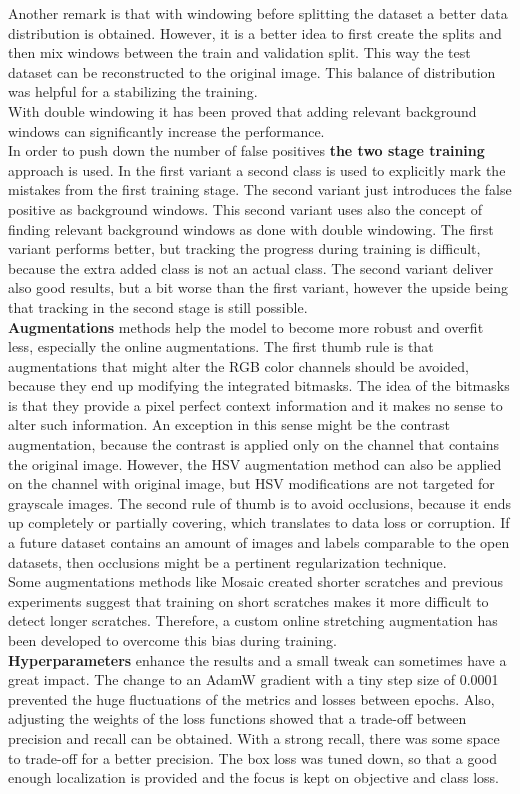 Another remark is that with windowing before splitting the dataset a better data distribution is obtained. However, it is a better idea to first create the splits and then mix windows between the train and validation split. This way the test dataset can be reconstructed to the original image. This balance of distribution was helpful for a stabilizing the training. \\
With double windowing it has been proved that adding relevant background windows can significantly increase the performance.\\
In order to push down the number of false positives \textbf{the two stage training} approach is used. In the first variant a second class is used to explicitly mark the mistakes from the first training stage. The second variant just introduces the false positive as background windows. This second variant uses also the concept of finding relevant background windows as done with double windowing. The first variant performs better, but tracking the progress during training is difficult, because the extra added class is not an actual class. The second variant deliver also good results, but a bit worse than the first variant, however the upside being that tracking in the second stage is still possible. \\
\textbf{Augmentations} methods help the model to become more robust and overfit less, especially the online augmentations. The first thumb rule is that augmentations that might alter the RGB color channels should be avoided, because they end up modifying the integrated bitmasks. The idea of the bitmasks is that they provide a pixel perfect context information and it makes no sense to alter such information. An exception in this sense might be the contrast augmentation, because the contrast is applied only on the channel that contains the original image. However, the HSV augmentation method can also be applied on the channel with original image, but HSV modifications are not targeted for grayscale images. The second rule of thumb is to avoid occlusions, because it ends up completely or partially covering, which translates to data loss or corruption. If a future dataset contains an amount of images and labels comparable to the open datasets, then occlusions might be a pertinent regularization technique. \\
Some augmentations methods like Mosaic created shorter scratches and previous experiments suggest that training on short scratches makes it more difficult to detect longer scratches. Therefore, a custom online stretching augmentation has been developed to overcome this bias during training. \\
\textbf{Hyperparameters} enhance the results and a small tweak can sometimes have a great impact. The change to an AdamW gradient with a tiny step size of 0.0001 prevented the huge fluctuations of the metrics and losses between epochs. Also, adjusting the weights of the loss functions showed that a trade-off between precision and recall can be obtained. With a strong recall, there was some space to trade-off for a better precision. The box loss was tuned down, so that a good enough localization is provided and the focus is kept on objective and class loss.

